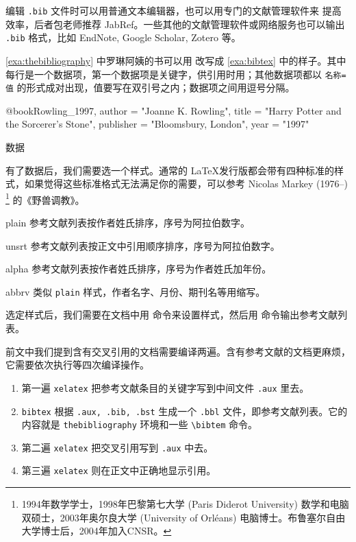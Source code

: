 编辑 \texttt{.bib} 文件时可以用普通文本编辑器，也可以用专门的文献管理软件来
提高效率，后者包老师推荐 JabRef。一些其他的文献管理软件或网络服务也可以输出 \texttt{.bib} 格式，比如 EndNote, Google Scholar, Zotero 等。

\autoref{exa:thebibliography} 中罗琳阿姨的书可以用 \BibTeX 改写成 \autoref{exa:bibtex} 中的样子。其中每行是一个数据项，第一个数据项是关键字，供引用时用；其他数据项都以 \texttt{名称=值} 的形式成对出现，值要写在双引号之内；数据项之间用逗号分隔。

\begin{example}[h]
\begin{Code}[]
@book{Rowling_1997,
    author    = "Joanne K. Rowling",
    title     = "Harry Potter and the Sorcerer's Stone",
    publisher = "Bloomsbury, London",
    year      = "1997"
}
\end{Code}
\caption{\BibTeX 数据}
\label{exa:bibtex}
\end{example}

有了数据后，我们需要选一个样式。通常的 \LaTeX 发行版都会带有四种标准的样式，如果觉得这些标准格式无法满足你的需要，可以参考 Nicolas Markey (1976--)\indexMarkey{} \footnote{1994年数学学士，1998年巴黎第七大学 (Paris Diderot University) 数学和电脑双硕士，2003年奥尔良大学 (University of Orléans) 电脑博士。布鲁塞尔自由大学博士后，2004年加入CNSR。} 的《野兽调教》\citep{Markey_2005}。

\begin{compactdesc}
    \item [plain] 参考文献列表按作者姓氏排序，序号为阿拉伯数字。
    \item [unsrt] 参考文献列表按正文中引用顺序排序，序号为阿拉伯数字。
    \item [alpha] 参考文献列表按作者姓氏排序，序号为作者姓氏加年份。
    \item [abbrv] 类似 \texttt{plain} 样式，作者名字、月份、期刊名等用缩写。
\end{compactdesc}

选定样式后，我们需要在文档中用 \verb|| 命令来设置样式，然后用 \verb|| 命令输出参考文献列表。

\begin{Code}[numbers=none]


\end{Code}

前文中我们提到含有交叉引用的文档需要编译两遍。含有参考文献的文档更麻烦，它需要依次执行等四次编译操作。

\begin{enumerate}
    \item 第一遍 \texttt{xelatex} 把参考文献条目的关键字写到中间文件 \texttt{.aux}  里去。
    \item \texttt{bibtex} 根据 \texttt{.aux, .bib, .bst} 生成一个 \texttt{.bbl}  文件，即参考文献列表。它的内容就是 \texttt{thebibliography} 环境和一些 \verb|\bibtem| 命令。
    \item 第二遍 \texttt{xelatex} 把交叉引用写到 \texttt{.aux} 中去。
    \item 第三遍 \texttt{xelatex} 则在正文中正确地显示引用。
\end{enumerate}

